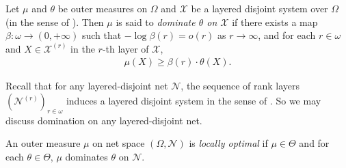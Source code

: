 \begin{definition}
    \label{definition:domination_over_LDS}
    Let $\mu$ and $\theta$ be outer measures on $\Omega$ and $\mathcal{X}$ be a layered disjoint system over $\Omega$ (in the sense of \cite{LL20}). Then $\mu$ is said to \textit{dominate $\theta$ on $\mathcal{X}$} if there exists a map $\beta : \omega \to (0, +\infty)$ such that $-\log \beta(r) = o(r)$ as $r \to \infty$, and for each $r \in \omega$ and $X \in \mathcal{X}^{(r)}$ in the $r$-th layer of $\mathcal{X}$,
    \begin{align*}
        \mu(X) \geq \beta(r) \cdot \theta(X).
    \end{align*}
\end{definition}

Recall that for any layered-disjoint net $\mathcal{N}$, the sequence of rank layers $(\mathcal{N}^{(r)})_{r \in \omega}$ induces a layered disjoint system in the sense of \cite{LL20}. So we may discuss domination on any layered-disjoint net.

\begin{definition}
    \label{definition:locally_optimal_for_net}
    An outer measure $\mu$ on net space $(\Omega, \mathcal{N})$ is \textit{locally optimal} if $\mu \in \Theta$ and for each $\theta \in \Theta$, $\mu$ dominates $\theta$ on $\mathcal{N}$. 
\end{definition}

